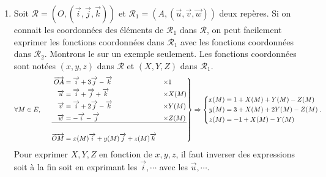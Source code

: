\begin{enumerate}
  \item Soit $\mathcal{R} = (O,(\overrightarrow{i},\overrightarrow{j},\overrightarrow{k}))$ et $\mathcal{R}_1 = (A,(\overrightarrow{u},\overrightarrow{v},\overrightarrow{w}))$ deux repères. Si on connait les coordonnées des éléments de $\mathcal{R}_1$ dans $\mathcal{R}$, on peut facilement exprimer les fonctions coordonnées dans $\mathcal{R}_1$ avec les fonctions coordonnées dans $\mathcal{R}_2$. Montrons le sur un exemple seulement.\newline
 Les fonctions coordonnées sont notées $(x,y,z)$ dans $\mathcal{R}$ et $(X,Y,Z)$ dans $\mathcal{R}_1$.  
\[
\forall M \in E, \hspace{0.5cm}
  \left.
  \begin{aligned}
    \overrightarrow{OA} &= \overrightarrow{i} + 3\overrightarrow{j} - \overrightarrow{k} &\times& 1\\
    \overrightarrow{u}  &= \overrightarrow{i} + \overrightarrow{j} + \overrightarrow{k} &\times& X(M)\\ 
    \overrightarrow{v}  &= \overrightarrow{i} +2\overrightarrow{j} -\overrightarrow{k} &\times&  Y(M)\\
    \overrightarrow{w}  &= -\overrightarrow{i} - \overrightarrow{j} &\times& Z(M) \\\hline\\
    \overrightarrow{OM} &= x(M)\overrightarrow{i} +y(M)\overrightarrow{j} + z(M)\overrightarrow{k}
  \end{aligned}
  \right\rbrace
  \Rightarrow 
  \left\lbrace
  \begin{aligned}
    x(M) &= 1 + X(M) + Y(M) -Z(M)\\ 
    y(M) &= 3 + X(M) + 2Y(M) -Z(M)\\
    z(M) &= -1 + X(M) - Y(M)
  \end{aligned}
  \right. .
\]
Pour exprimer $X, Y, Z$ en fonction de $x, y, z$, il faut inverser des expressions soit à la fin soit en exprimant les $\overrightarrow{i}, \cdots$ avec les $\overrightarrow{u}, \cdots$.


\end{enumerate}
